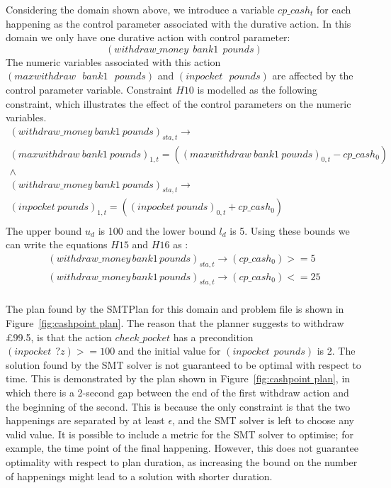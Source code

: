 Considering the domain shown above, we introduce a variable $cp\_cash_t$ for each happening as the control parameter associated with the durative action. In this domain we only have one durative action with control parameter:
$$
(withdraw\_money \ \  bank1 \ \  pounds)
$$
The numeric variables associated with this action $(maxwithdraw \ \ \ bank1 \ \ \ pounds)$ and  $(inpocket \ \ \ pounds)$ are affected by the control parameter variable. Constraint $H10$ is modelled as the following constraint, which illustrates the effect of the control parameters on the numeric variables.
$$
\begin{array}{c}
(withdraw\_money\ bank1\ pounds)_{sta,t}  \rightarrow \\
(maxwithdraw\ bank1\ pounds)_{1,t} = ((maxwithdraw\ bank1\ pounds)_{0,t} - cp\_cash_0) \\
\wedge \\
(withdraw\_money\ bank1\ pounds)_{sta,t}  \rightarrow \\
(inpocket\ pounds)_{1,t} = ((inpocket\ pounds)_{0,t} + cp\_cash_0) \\
\end{array}
$$
The upper bound $u_d$ is 100 and the lower bound $l_d$ is 5. Using these bounds we can write the equations $H15$ and $H16$ as :
$$
\begin{array}{l}
(withdraw\_money \, bank1 \, pounds)_{sta,t}  \rightarrow (cp\_cash_0) >=  5 \\
(withdraw\_money \, bank1 \, pounds)_{sta,t}  \rightarrow (cp\_cash_0) <=  25  \\
\end{array}
$$

The plan found by the SMTPlan for this domain and problem file is shown in Figure~\ref{fig:cashpoint plan}. The reason that the planner suggests to withdraw \pounds99.5, is that the action $check\_pocket$ has a precondition $(inpocket \ \ ?z) >= 100$ and the initial value for $(inpocket \ \ pounds)$ is 2. The solution found by the SMT solver is not guaranteed to be optimal with respect to time. This is demonstrated by the plan shown in Figure~\ref{fig:cashpoint plan}, in which there is a 2-second gap between the end of the first withdraw action and the beginning of the second. This is because the only constraint is that the two happenings are separated by at least $\epsilon$, and the SMT solver is left to choose any valid value. It is possible to include a metric for the SMT solver to optimise; for example, the time point of the final happening. However, this does not guarantee optimality with respect to plan duration, as increasing the bound on the number of happenings might lead to a solution with shorter duration.

